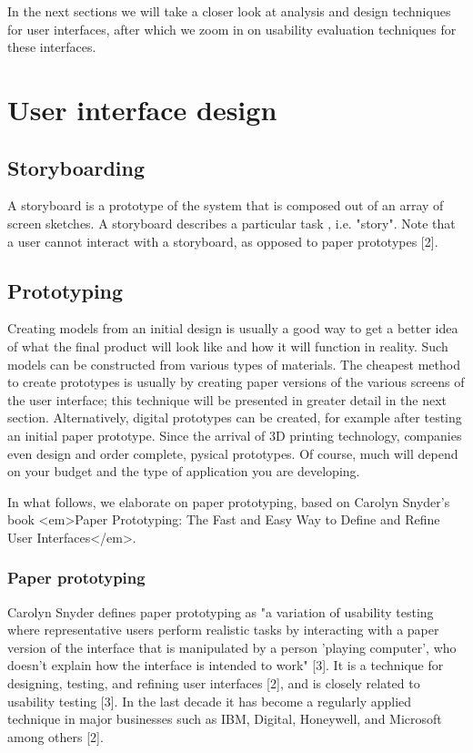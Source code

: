 In the next sections we will take a closer look at analysis and design techniques for user interfaces, after which we zoom in on usability evaluation techniques for these interfaces.



\section{User interface design}

\subsection{Storyboarding}

A storyboard is a prototype of the system that is composed out of an array of screen sketches. A storyboard describes a particular task , i.e. "story". Note that a user cannot interact with a storyboard, as opposed to paper prototypes [2].


\subsection{Prototyping}

Creating models from an initial design is usually a good way to get a better idea of what the final product will look like and how it will function in reality. Such models can be constructed from various types of materials. The cheapest method to create prototypes is usually by creating paper versions of the various screens of the user interface; this technique will be presented in greater detail in the next section. Alternatively, digital prototypes can be created, for example after testing an initial paper prototype. Since the arrival of 3D printing technology, companies even design and order complete, pysical prototypes. Of course, much will depend on your budget and the type of application you are developing.

In what follows, we elaborate on paper prototyping, based on Carolyn Snyder's book <em>Paper Prototyping: The Fast and Easy Way to Define and Refine User Interfaces</em>.

\subsubsection{Paper prototyping}

Carolyn Snyder defines paper prototyping as "a variation of usability testing where representative users perform realistic tasks by interacting with a paper version of the interface that is manipulated by a person 'playing computer', who doesn't explain how the interface is intended to work" [3]. It is a technique for designing, testing, and refining user interfaces [2], and is closely related to usability testing [3]. In the last decade it has become a regularly applied technique in major businesses such as IBM, Digital, Honeywell, and Microsoft among others [2].

